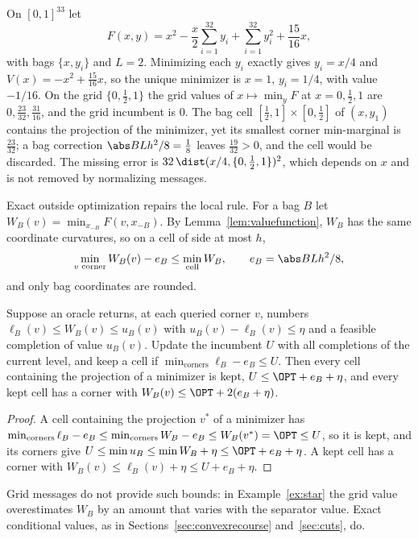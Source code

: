 \begin{example}[Star]\label{ex:star}
On $[0,1]^{33}$ let
\[
F(x,y)=x^2-\frac x2\sum_{i=1}^{32}y_i+\sum_{i=1}^{32}y_i^2+\frac{15}{16}x ,
\]
with bags $\{x,y_i\}$ and $L=2$. Minimizing each $y_i$ exactly gives
$y_i=x/4$ and $V(x)=-x^2+\frac{15}{16}x$, so the unique minimizer is
$x=1$, $y_i=1/4$, with value $-1/16$. On the grid $\{0,\frac12,1\}$ the
grid values of $x\mapsto\min_yF$ at $x=0,\frac12,1$ are $0,\frac{23}{32},
\frac{31}{16}$, and the grid incumbent is $0$. The bag cell
$[\frac12,1]\times[0,\frac12]$ of $(x,y_1)$ contains the projection of the
minimizer, yet its smallest corner min-marginal is $\frac{23}{32}$; a bag
correction $\abs BLh^2/8=\frac18$ leaves $\frac{19}{32}>0$, and the cell would
be discarded. The missing error is $32\,\dist(x/4,\{0,\frac12,1\})^2$, which
depends on $x$ and is not removed by normalizing messages.
\end{example}

Exact outside optimization repairs the local rule. For a bag $B$ let
$W_B(v)=\min_{x_{-B}}F(v,x_{-B})$. By Lemma~\ref{lem:valuefunction}, $W_B$
has the same coordinate curvatures, so on a cell of side at most $h$,
\[
\min_{v\text{ corner}}W_B(v)-e_B\le\min_{\text{cell}}W_B,\qquad e_B=\abs BLh^2/8 ,
\]
and only bag coordinates are rounded.

\begin{proposition}\label{prop:interface}
Suppose an oracle returns, at each queried corner $v$, numbers
$\ell_B(v)\le W_B(v)\le u_B(v)$ with $u_B(v)-\ell_B(v)\le\eta$ and a feasible
completion of value $u_B(v)$. Update the incumbent $U$ with all completions
of the current level, and keep a cell if $\min_{\text{corners}}\ell_B-e_B\le
U$. Then every cell containing the projection of a minimizer is kept,
$U\le\OPT+e_B+\eta$, and every kept cell has a corner with
$W_B(v)\le\OPT+2(e_B+\eta)$.
\end{proposition}

\begin{proof}
A cell containing the projection $v^*$ of a minimizer has
$\min_{\text{corners}}\ell_B-e_B\le\min_{\text{corners}}W_B-e_B\le
W_B(v^*)=\OPT\le U$, so it is kept, and its corners give
$U\le\min u_B\le\min W_B+\eta\le\OPT+e_B+\eta$. A kept cell has a corner with
$W_B(v)\le\ell_B(v)+\eta\le U+e_B+\eta$.
\end{proof}

Grid messages do not provide such bounds: in Example~\ref{ex:star} the
grid value overestimates $W_B$ by an amount that varies with the separator
value. Exact conditional values, as in
Sections~\ref{sec:convexrecourse} and~\ref{sec:cuts}, do.
